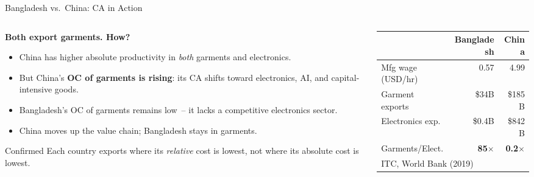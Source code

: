 \documentclass[aspectratio=169]{beamer}
\begin{document}
\begin{frame}{Bangladesh vs.\ China: CA in Action}
\begin{columns}[T]
\begin{column}{0.53\textwidth}
\textbf{Both export garments.  How?}
\begin{itemize}\small
  \item China has higher absolute productivity in
        \emph{both} garments and electronics.
  \item But China's \textbf{OC of garments is rising}:
        its CA shifts toward electronics, AI, and
        capital-intensive goods.
  \item Bangladesh's OC of garments remains low~--
        it lacks a competitive electronics sector.
  \item China moves up the value chain; Bangladesh stays
        in garments.
\end{itemize}
\vspace{0.2em}
\begin{insight}{Confirmed}
\footnotesize Each country exports where its
\emph{relative} cost is lowest, not where its absolute
cost is lowest.
\end{insight}
\end{column}
\begin{column}{0.44\textwidth}
\begin{adjustbox}{max width=\columnwidth}
\begin{tabular}{lrr}
\toprule
 & \textbf{Bangladesh} & \textbf{China}\\
\midrule
Mfg wage (USD/hr) & 0.57 & 4.99\\
Garment exports   & \$34B & \$185B\\
Electronics exp.  & \$0.4B & \$842B\\
\midrule
Garments/Elect.   & \textbf{85}$\times$ &
                    \textbf{0.2}$\times$\\
\bottomrule
\multicolumn{3}{l}{\tiny ITC, World Bank (2019)}
\end{tabular}
\end{adjustbox}
\vspace{0.3em}

\end{column}
\end{columns}
\end{frame}
\end{document}
